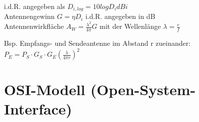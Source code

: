 \documentclass[fs, footer]{latex4ei}
\begin{document}
\begin{multicols*}{4}
{	i.d.R. angegeben als $D_{i,log} = 10 log D_i dBi $ \\
	
	Antennengewinn $ G = \eta D_i$ i.d.R. angegeben in dB \\
	
	Antennenwirkfläche $ A_W = \frac{\lambda^2}{4 \pi} G $
	mit der Wellenlänge $\lambda = \frac{c}{f}$
	
	Bsp. Empfangs- und Sendeantenne im Abstand r zueinander: \\ $P_E = P_S \cdot G_S \cdot G_E (\frac{\lambda}{4 \pi r})^2$ \\
}

\section{OSI-Modell (Open-System-Interface)}





\end{multicols*}
\end{document}
